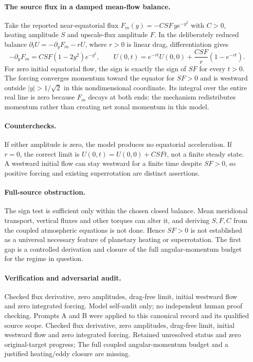 \documentclass[11pt]{article}
\begin{document}
\paragraph{The source flux in a damped mean-flow balance.} Take the reported near-equatorial flux $F_m(y)=-C SF\,y e^{-y^2}$ with $C>0$, heating amplitude $S$ and upscale-flux amplitude $F$. In the deliberately reduced balance $\partial_tU=-\partial_yF_m-rU$, where $r>0$ is linear drag, differentiation gives
\[
 -\partial_yF_m=C SF(1-2y^2)e^{-y^2},\qquad
 U(0,t)=e^{-rt}U(0,0)+\frac{CSF}{r}(1-e^{-rt}).
\]
For zero initial equatorial flow, the sign is exactly the sign of $SF$ for every $t>0$. The forcing converges momentum toward the equator for $SF>0$ and is westward outside $|y|>1/\sqrt2$ in this nondimensional coordinate. Its integral over the entire real line is zero because $F_m$ decays at both ends: the mechanism redistributes momentum rather than creating net zonal momentum in this model.

\paragraph{Counterchecks.} If either amplitude is zero, the model produces no equatorial acceleration. If $r=0$, the correct limit is $U(0,t)=U(0,0)+CSFt$, not a finite steady state. A westward initial flow can stay westward for a finite time despite $SF>0$, so positive forcing and existing superrotation are distinct assertions.

\paragraph{Full-source obstruction.} The sign test is sufficient only within the chosen closed balance. Mean meridional transport, vertical fluxes and other torques can alter it, and deriving $S,F,C$ from the coupled atmospheric equations is not done. Hence $SF>0$ is not established as a universal necessary feature of planetary heating or superrotation. The first gap is a controlled derivation and closure of the full angular-momentum budget for the regime in question.

\paragraph{Verification and adversarial audit.}
Checked flux derivative, zero amplitudes, drag-free limit, initial westward flow and zero integrated forcing. Model self-audit only; no independent human proof checking. Prompts A and B were applied to this canonical record and its qualified source scope. Checked flux derivative, zero amplitudes, drag-free limit, initial westward flow and zero integrated forcing. Retained unresolved status and zero original-target progress; The full coupled angular-momentum budget and a justified heating/eddy closure are missing.
\end{document}
